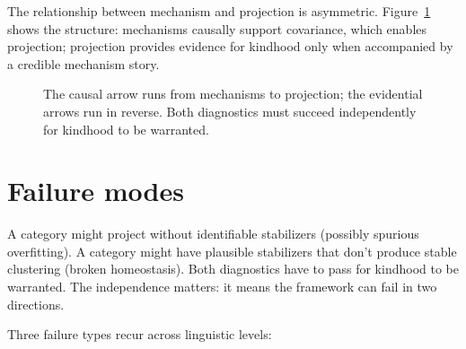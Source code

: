 The relationship between mechanism and projection is asymmetric. Figure~\ref{fig:app:asymmetry} shows the structure: mechanisms causally support covariance, which enables projection; projection provides evidence for kindhood only when accompanied by a credible mechanism story.

\begin{figure}[htbp]
\centering
{}
\caption{The causal arrow runs from mechanisms to projection; the evidential arrows run in reverse. Both diagnostics must succeed independently for kindhood to be warranted.}
\label{fig:app:asymmetry}
\end{figure}

\section{Failure modes}

A category might project without identifiable stabilizers (possibly spurious overfitting). A category might have plausible stabilizers that don't produce stable clustering (broken homeostasis). Both diagnostics have to pass for kindhood to be warranted. The independence matters: it means the framework can fail in two directions.

Three failure types recur across linguistic levels:


